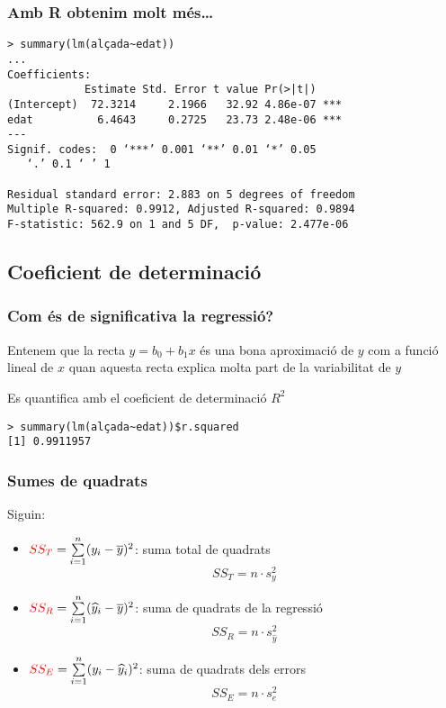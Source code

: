 \documentclass[12pt,t]{beamer}
\newcommand{\red}[1]{\textcolor{red}{#1}}
\renewcommand{\emph}[1]{{\color{red}#1}}
\theoremstyle{plain}
\theoremstyle{definition}
\begin{document}
\begin{frame}[fragile]
\frametitle{Amb R obtenim molt més\ldots}
\footnotesize \begin{verbatim}
> summary(lm(alçada~edat))
...
Coefficients:
            Estimate Std. Error t value Pr(>|t|)    
(Intercept)  72.3214     2.1966   32.92 4.86e-07 ***
edat          6.4643     0.2725   23.73 2.48e-06 ***
---
Signif. codes:  0 ‘***’ 0.001 ‘**’ 0.01 ‘*’ 0.05
   ‘.’ 0.1 ‘ ’ 1 

Residual standard error: 2.883 on 5 degrees of freedom
Multiple R-squared: 0.9912,	Adjusted R-squared: 0.9894 
F-statistic: 562.9 on 1 and 5 DF,  p-value: 2.477e-06 
\end{verbatim}
\end{frame}


\subsection{Coeficient de determinació}
\begin{frame}[fragile]
\frametitle{Com és de significativa la regressió?}

Entenem que la recta $\widehat{y}=b_0+b_1x$ és una bona aproximació de $y$ com a funció lineal de $x$ quan 
aquesta recta explica
molta part de la variabilitat de $y$\bigskip

Es quantifica amb el \emph{coeficient de determinació $R^2$}
\begin{verbatim}
> summary(lm(alçada~edat))$r.squared
[1] 0.9911957
\end{verbatim}

\end{frame}

\begin{frame}
\frametitle{Sumes de quadrats}
Siguin:
\begin{itemize}
\item $\red{SS_T} =\sum\limits_{i=1}^n(y_i-\overline{y})^2$: suma total de quadrats
$$
SS_T=n\cdot s_y^2
$$

\item $\red{SS_R}=\sum\limits_{i=1}^n(\widehat{y}_i-\overline{y})^2$: suma de quadrats de la regressió 
$$
SS_R=n\cdot s_{\widehat{y}}^2
$$

\item $\red{SS_E}=\sum\limits_{i=1}^n(y_i-\widehat{y}_i)^2$: suma de quadrats dels errors
$$
SS_E=n\cdot s_e^2
$$
\end{itemize}

\end{frame}
\end{document}
